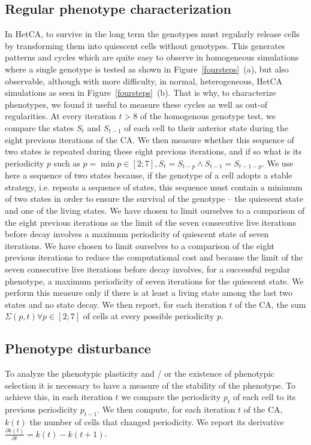 \subsection{Regular phenotype characterization} 
In HetCA, to survive in the long term the genotypes must regularly release cells by transforming them into quiescent cells without genotypes. This generates patterns and cycles which are quite easy to observe in homogeneous simulations where a single genotype is tested as shown in Figure~\ref{foursteps}~(a), but also observable, although with more difficulty, in normal, heterogeneous, HetCA simulations as seen in Figure~\ref{foursteps}~(b). That is why, to characterize phenotypes, we found it useful to measure these cycles as well as out-of regularities. At every iteration $t>8$ of the homogenous genotype test, we compare the states $S_t$ and $S_{t-1}$ of each cell to their anterior state during the eight previous iterations of the CA. We then measure whether this sequence of two states is repeated during these eight previous iterations, and if so what is its periodicity $p$ such as $p=\min p \in [2;7], S_t=S_{t-p} \wedge S_{t-1}=S_{t-1-p}$. We use here a sequence of two states because, if the genotype of a cell adopts a stable strategy, i.e. repeats a sequence of states, this sequence must contain a minimum of two states in order to ensure the survival of the genotype -- the quiescent state and one of the living states. We have chosen to limit ourselves to a comparison of the eight previous iterations as the limit of the seven consecutive live iterations before decay involves a maximum periodicity of quiescent state of seven iterations. We have chosen to limit ourselves to a comparison of the eight previous iterations to reduce the computational cost and because the limit of the seven consecutive live iterations before decay involves, for a successful regular phenotype, a maximum periodicity of seven iterations for the quiescent state. We perform this measure only if there is at least a living state among the last two states and no state decay. We then report, for each iteration $t$ of the CA, the sum $\Sigma(p,t)\forall p \in [2;7]$ of cells at every possible periodicity $p$. 

\subsection{Phenotype disturbance} 
To analyze the phenotypic plasticity and / or the existence of phenotypic selection it is necessary to have a measure of the stability of the phenotype. To achieve this, in each iteration $t$ we compare the periodicity $p_t$ of each cell to its previous periodicity $p_{t-1}$. We then compute, for each iteration $t$ of the CA, $k(t)$ the number of cells that changed periodicity. We report its derivative $ \frac{\partial k(t)}{\partial t}= k(t)-k(t+1)$.

